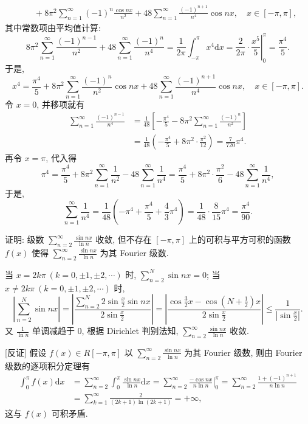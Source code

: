 \begin{solution}[证法 2]
\[\begin{aligned}
    &\quad+8\pi^{2}\sum_{n=1}^{\infty}(-1)^{n}\frac{\cos nx}{n^{2}}+48\sum_{n=1}^{\infty}\frac{(-1)^{n+1}}{n^{4}}\cos nx,\quad x\in[-\pi,\pi],
  \end{aligned}
\]
其中常数项由平均值计算:
\[
  8\pi^{2}\sum_{n=1}^{\infty}\frac{(-1)^{n-1}}{n^{2}}+48\sum_{n=1}^{\infty}\frac{(-1)^{n}}{n^{4}}=\frac{1}{2\pi}\int_{-\pi}^{\pi}x^{4}\mathrm{d}x=\frac{2}{2\pi}\cdot\left.\frac{x^{5}}{5}\right|_{0}^{\pi}=\frac{\pi^{4}}{5}.
\]
于是,
\[
  x^{4}=\frac{\pi^{4}}{5}+8\pi^{2}\sum_{n=1}^{\infty}\frac{(-1)^{n}}{n^{2}}\cos nx+48\sum_{n=1}^{\infty}\frac{(-1)^{n+1}}{n^{4}}\cos nx,\quad x\in[-\pi,\pi].
\]
令 $x=0$, 并移项就有
\[
  \begin{aligned}
    \sum_{n=1}^{\infty}\frac{(-1)^{n-1}}{n^{4}}&=\frac{1}{48}\left[-\frac{\pi^{4}}{5}-8\pi^{2}\sum_{n=1}^{\infty}\frac{(-1)^{n}}{n^{2}}\right]\\
    &=\frac{1}{48}\left(-\frac{\pi^{4}}{5}+8\pi^{2}\cdot\frac{\pi^{2}}{12}\right)=\frac{7}{720}\pi^{4}.
  \end{aligned}
\]
再令 $x=\pi$, 代入得
\[
  \pi^{4}=\frac{\pi^{4}}{5}+8\pi^{2}\sum_{n=1}^{\infty}\frac{1}{n^{2}}-48\sum_{n=1}^{\infty}\frac{1}{n^{4}}=\frac{\pi^{4}}{5}+8\pi^{2}\cdot\frac{\pi^{2}}{6}-48\sum_{n=1}^{\infty}\frac{1}{n^{4}},
\]
于是,
\[
  \sum_{n=1}^{\infty}\frac{1}{n^{4}}=\frac{1}{48}\left(-\pi^{4}+\frac{\pi^{4}}{5}+\frac{4}{3}\pi^{4}\right)=\frac{1}{48}\cdot\frac{8}{15}\pi^{4}=\frac{\pi^{4}}{90}.
\]
\end{solution}

\begin{example}\label{ex:16.2.3}
证明: 级数 $\sum_{n=2}^{\infty} \frac{\sin nx}{\ln n}$ 收敛, 但不存在 $[-\pi, \pi]$ 上的可积与平方可积的函数 $f(x)$ 使得 $\sum_{n=2}^{\infty} \frac{\sin nx}{\ln n}$ 为其 Fourier 级数.
\end{example}

\begin{solution}[证法 1]
当 $x = 2k\pi\ (k = 0, \pm 1, \pm 2, \cdots)$ 时, $\sum_{n=2}^{N} \sin n x = 0$; 当 $x \neq 2k\pi\ (k = 0, \pm 1, \pm 2, \cdots)$ 时,
\[
  \left|\sum_{n=2}^{N}\sin nx\right|=\left|\frac{\sum_{n=2}^{N}2\sin\frac{x}{2}\sin nx}{2\sin\frac{x}{2}}\right|=\left|\frac{\cos\frac{3}{2}x-\cos\left(N+\frac{1}{2}\right)x}{2\sin\frac{x}{2}}\right|\leqslant\frac{1}{\left|\sin\frac{x}{2}\right|}.
\]
又 $\frac{1}{\ln n}$ 单调减趋于 $0$, 根据 Dirichlet 判别法知, $\sum_{n=2}^{\infty}\frac{\sin nx}{\ln n}$ 收敛.

[反证] 假设 $f(x) \in R[-\pi, \pi]$ 以 $\sum_{n=2}^{\infty} \frac{\sin nx}{\ln n}$ 为其 Fourier 级数, 则由 Fourier 级数的逐项积分定理有
\[
  \begin{aligned}
    \int_{0}^{\pi}f(x)\mathrm{d}x&=\sum_{n=2}^{\infty}\int_{0}^{\pi}\frac{\sin nx}{\ln n}\mathrm{d}x=\sum_{n=2}^{\infty}\left.\frac{-\cos n x}{n\ln n}\right|_{0}^{\pi}=\sum_{n=2}^{\infty}\frac{1+(-1)^{n+1}}{n\ln n}\\
    &=\sum_{k=1}^{\infty}\frac{2}{(2k+1)\ln(2k+1)}=+\infty,
  \end{aligned}
\]
这与 $f(x)$ 可积矛盾.
\noqedhere
\end{solution}

